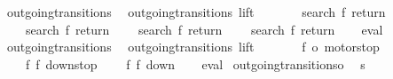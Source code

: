 \begin{isabellebody}
\ outgoing{\isacharunderscore}transitions{\isacharunderscore}{}{\isacharcolon}\isanewline
\ \ {\isachardoublequoteopen}outgoing{\isacharunderscore}transitions\ lift\ {}\ {\isacharequal}\ {\isacharbraceleft}{\isacharbar}\isanewline
\ \ \ \ {\isacharparenleft}{\isacharparenleft}search{\isacharcomma}\ f{}{\isacharparenright}{\isacharcomma}\ return{}{\isacharparenright}{\isacharcomma}\isanewline
\ \ \ \ {\isacharparenleft}{\isacharparenleft}search{\isacharcomma}\ f{}{\isacharparenright}{\isacharcomma}\ return{}{\isacharparenright}{\isacharcomma}\isanewline
\ \ \ \ {\isacharparenleft}{\isacharparenleft}search{\isacharcomma}\ f{}{\isacharparenright}{\isacharcomma}\ return{}{\isacharparenright}{\isacharcomma}\isanewline
\ \ \ \ {\isacharparenleft}{\isacharparenleft}search{\isacharcomma}\ f{}{\isacharparenright}{\isacharcomma}\ return{}{\isacharparenright}\isanewline
{\isacharbar}{\isacharbraceright}{\isachardoublequoteclose}\isanewline
%
\isadelimproof
\ \ %
\endisadelimproof
%
\isatagproof
{}\isamarkupfalse%
\ eval%
\endisatagproof
{\isafoldproof}%
%
\isadelimproof
\isanewline
%
\endisadelimproof
\isanewline
{}\isamarkupfalse%
\ outgoing{\isacharunderscore}transitions{\isacharunderscore}{}{\isacharcolon}\isanewline
\ \ {\isachardoublequoteopen}outgoing{\isacharunderscore}transitions\ lift\ {}\ {\isacharequal}\ {\isacharbraceleft}{\isacharbar}\isanewline
\ \ \ \ {\isacharparenleft}{\isacharparenleft}f{}{\isacharcomma}\ o{}{\isacharparenright}{\isacharcomma}\ motorstop{}{\isacharparenright}{\isacharcomma}\isanewline
\ \ \ \ {\isacharparenleft}{\isacharparenleft}f{}{\isacharcomma}\ f{}{\isacharparenright}{\isacharcomma}\ down{}{}stop{\isacharparenright}{\isacharcomma}\isanewline
\ \ \ \ {\isacharparenleft}{\isacharparenleft}f{}{\isacharcomma}\ f{}{\isacharparenright}{\isacharcomma}\ down{}{}{\isacharparenright}\isanewline
{\isacharbar}{\isacharbraceright}{\isachardoublequoteclose}\isanewline
%
\isadelimproof
\ \ %
\endisadelimproof
%
\isatagproof
{}\isamarkupfalse%
\ eval%
\endisatagproof
{\isafoldproof}%
%
\isadelimproof
\isanewline
%
\endisadelimproof
\isanewline
{}\isamarkupfalse%
\ outgoing{\isacharunderscore}transitions{\isacharunderscore}o{\isacharcolon}\isanewline
\ \ {\isachardoublequoteopen}s\ {\isasymin}\ {\isacharbraceleft}{}{\isacharcomma}\ {}{\isacharcomma}\ {}{\isacharcomma}\ {}{\isacharbraceright}\ {\isasymLongrightarrow}\isanewline

\end{isabellebody}
